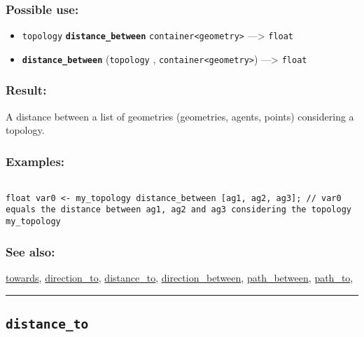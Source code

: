 \documentclass[]{book}
\providecommand{\tightlist}{%
  \setlength{\itemsep}{0pt}\setlength{\parskip}{0pt}}
\theoremstyle{definition}
\theoremstyle{definition}
\theoremstyle{definition}
\theoremstyle{remark}
\begin{document}
\subsubsection{Possible use:}\label{possible-use-135}

\begin{itemize}
\tightlist
\item
  \texttt{topology} \textbf{\texttt{distance\_between}}
  \texttt{container\textless{}geometry\textgreater{}} ---\textgreater{}
  \texttt{float}
\item
  \textbf{\texttt{distance\_between}} (\texttt{topology} ,
  \texttt{container\textless{}geometry\textgreater{}}) ---\textgreater{}
  \texttt{float}
\end{itemize}

\subsubsection{Result:}\label{result-131}

A distance between a list of geometries (geometries, agents, points)
considering a topology.

\subsubsection{Examples:}\label{examples-102}

\begin{verbatim}
 
float var0 <- my_topology distance_between [ag1, ag2, ag3]; // var0 equals the distance between ag1, ag2 and ag3 considering the topology my_topology
\end{verbatim}

\subsubsection{See also:}\label{see-also-80}

\href{OperatorsSZ\#towards}{towards},
\href{OperatorsDH\#direction_to}{direction\_to},
\href{OperatorsDH\#distance_to}{distance\_to},
\href{OperatorsDH\#direction_between}{direction\_between},
\href{OperatorsNR\#path_between}{path\_between},
\href{OperatorsNR\#path_to}{path\_to},

\begin{center}\rule{0.5\linewidth}{\linethickness}\end{center}

\subsection{\texorpdfstring{\texttt{distance\_to}}{distance\_to}}\label{distance_to}
\end{document}
